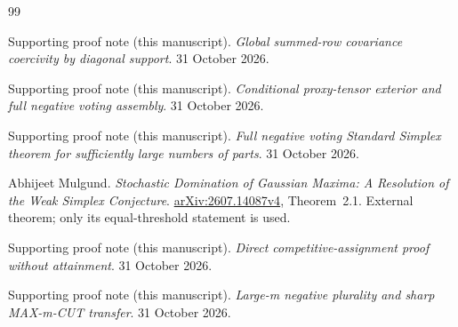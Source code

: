 \begin{thebibliography}{99}

Supporting proof note (this manuscript). \emph{Global summed-row covariance coercivity by diagonal support}. 31 October 2026.

\par{}




Supporting proof note (this manuscript). \emph{Conditional proxy-tensor exterior and full negative voting assembly}. 31 October 2026.

\par{}




Supporting proof note (this manuscript). \emph{Full negative voting Standard Simplex theorem for sufficiently large numbers of parts}. 31 October 2026.

\par{}




Abhijeet Mulgund. \emph{Stochastic Domination of Gaussian Maxima: A Resolution of the Weak Simplex Conjecture}. \href{https://arxiv.org/html/2607.14087v4}{arXiv:2607.14087v4}, Theorem~2.1. External theorem; only its equal-threshold statement is used.







Supporting proof note (this manuscript). \emph{Direct competitive-assignment proof without attainment}. 31 October 2026.

\par{}




Supporting proof note (this manuscript). \emph{Large-m negative plurality and sharp MAX-m-CUT transfer}. 31 October 2026.

\par{}




\end{thebibliography}
